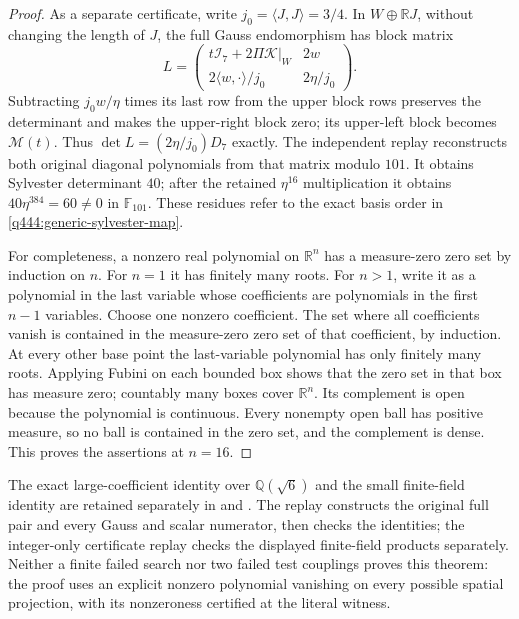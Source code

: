 \begin{proof}
As a separate certificate, write $j_0=\langle J,J\rangle=3/4$.
In $W\oplus\mathbb RJ$, without changing the length of $J$, the
full Gauss endomorphism has block matrix
\[
 L=\begin{pmatrix}
 t\mathcal I_7+2\Pi\mathcal K|_W&2w\\
 2\langle w,\cdot\rangle/j_0&2\eta/j_0
 \end{pmatrix}.
\]
Subtracting $j_0w/\eta$ times its last row from the upper block rows
preserves the determinant and makes the upper-right block zero; its
upper-left block becomes $\mathscr M(t)$. Thus
$\det L=(2\eta/j_0)D_7$ exactly.
The independent replay reconstructs both original diagonal polynomials
from that matrix modulo $101$. It obtains Sylvester determinant $40$;
after the retained $\eta^{16}$ multiplication it obtains
$40\eta^{384}=60\ne0$ in $\mathbb F_{101}$. These residues refer
to the exact basis order in \eqref{q444:generic-sylvester-map}.

For completeness, a nonzero real polynomial on $\mathbb R^n$ has a
measure-zero zero set by induction on $n$. For $n=1$ it has finitely
many roots. For $n>1$, write it as a polynomial in the last variable
whose coefficients are polynomials in the first $n-1$ variables.
Choose one nonzero coefficient. The set where all coefficients vanish
is contained in the measure-zero zero set of that coefficient, by
induction. At every other base point the last-variable polynomial has
only finitely many roots. Applying Fubini on each bounded box shows
that the zero set in that box has measure zero; countably many boxes
cover $\mathbb R^n$. Its complement is open because the polynomial
is continuous. Every nonempty open ball has positive measure, so no
ball is contained in the zero set, and the complement is dense.
This proves the assertions at $n=16$.
\end{proof}

The exact large-coefficient identity over $\mathbb Q(\sqrt6)$ and
the small finite-field identity are retained separately in
 and
. The replay
 constructs the original full pair and every
Gauss and scalar numerator, then checks the identities; the integer-only
certificate replay checks the displayed finite-field products separately.
Neither a finite failed search nor two failed test couplings proves this
theorem: the proof uses an explicit nonzero polynomial vanishing on
every possible spatial projection, with its nonzeroness certified at
the literal witness.
